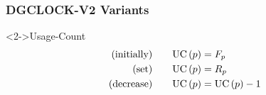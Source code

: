 

\begin{frame}
    \frametitle{DGCLOCK-V2 Variants}

    \begin{block}<2->{Usage-Count}
        \vspace{-2em}
        \begin{align*}
            \text{(initially)\qquad}\text{UC}\left(p\right) &= F_p\\
            \text{(set)\qquad}\text{UC}\left(p\right) &= R_p\\
            \text{(decrease)\qquad}\text{UC}\left(p\right) &= \text{UC}\left(p\right) - 1
        \end{align*}
        \vspace{-1.5em}
    \end{block}


\end{frame}
